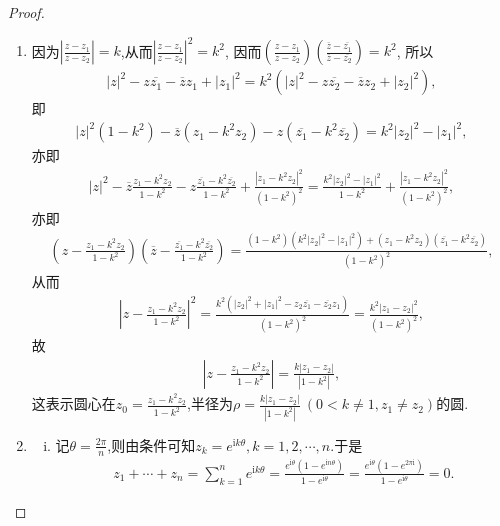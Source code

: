 \documentclass[../../main.tex]{subfiles}%
\begin{document}
\begin{proof}
\begin{enumerate}[(1)]
\item 因为$\left| \frac{z - z_1}{z - z_2} \right| = k$,从而$\left| \frac{z - z_1}{z - z_2} \right|^2 = k^2$,
因而$\left( \frac{z - z_1}{z - z_2} \right) \left( \frac{\overline{z} - \overline{z_1}}{\overline{z} - \overline{z_2}} \right) = k^2$,
所以
\begin{align*}
\left| z \right|^2 - z \overline{z_1} - \overline{z} z_1 + \left| z_1 \right|^2 = k^2 \left( \left| z \right|^2 - z \overline{z_2} - \overline{z} z_2 + \left| z_2 \right|^2 \right),
\end{align*}
即
\begin{align*}
\left| z \right|^2 (1 - k^2) - \overline{z} (z_1 - k^2 z_2) - z (\overline{z_1} - k^2 \overline{z_2}) = k^2 \left| z_2 \right|^2 - \left| z_1 \right|^2,
\end{align*}
亦即
\begin{align*}
\left| z \right|^2 - \overline{z} \frac{z_1 - k^2 z_2}{1 - k^2} - z \frac{\overline{z_1} - k^2 \overline{z_2}}{1 - k^2} + \frac{\left| z_1 - k^2 z_2 \right|^2}{(1 - k^2)^2} = \frac{k^2 \left| z_2 \right|^2 - \left| z_1 \right|^2}{1 - k^2} + \frac{\left| z_1 - k^2 z_2 \right|^2}{(1 - k^2)^2},
\end{align*}
亦即
\begin{align*}
\left( z - \frac{z_1 - k^2 z_2}{1 - k^2} \right) \left( \overline{z} - \frac{\overline{z_1} - k^2 \overline{z_2}}{1 - k^2} \right) = \frac{(1 - k^2)(k^2 \left| z_2 \right|^2 - \left| z_1 \right|^2) + (z_1 - k^2 z_2)(\overline{z_1} - k^2 \overline{z_2})}{(1 - k^2)^2},
\end{align*}
从而
\begin{align*}
\left| z - \frac{z_1 - k^2 z_2}{1 - k^2} \right|^2 = \frac{k^2 ( \left| z_2 \right|^2 + \left| z_1 \right|^2 - z_2 \overline{z_1} - \overline{z_2} z_1 )}{(1 - k^2)^2} = \frac{k^2 \left| z_1 - z_2 \right|^2}{(1 - k^2)^2},
\end{align*}
故
\begin{align*}
\left| z - \frac{z_1 - k^2 z_2}{1 - k^2} \right| = \frac{k \left| z_1 - z_2 \right|}{\left| 1 - k^2 \right|},
\end{align*}
这表示圆心在$z_0 = \frac{z_1 - k^2 z_2}{1 - k^2}$,半径为$\rho = \frac{k \left| z_1 - z_2 \right|}{\left| 1 - k^2 \right|} \ (0 < k \neq 1, z_1 \neq z_2)$的圆.

\item \begin{enumerate}[(i)]
\item 记$\theta =\frac{2\pi}{n}$,则由条件可知$z_k=e^{\mathrm{i}k\theta},k=1,2,\cdots ,n.$于是
\begin{align*}
z_1+\cdots +z_n=\sum\limits_{k=1}^n{e^{\mathrm{i}k\theta}}=\frac{e^{\mathrm{i}\theta}\left( 1-e^{\mathrm{i}n\theta} \right)}{1-e^{\mathrm{i}\theta}}=\frac{e^{\mathrm{i}\theta}\left( 1-e^{2\pi \mathrm{i}} \right)}{1-e^{\mathrm{i}\theta}}=0.
\end{align*}


\end{enumerate}
\end{enumerate}
\end{proof}
\end{document}
